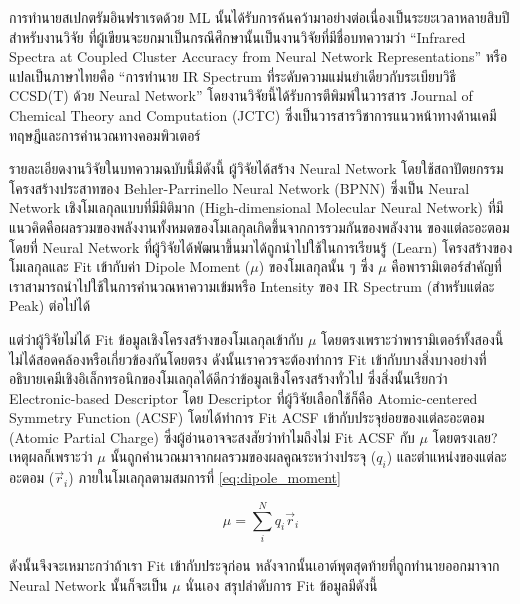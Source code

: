 การทำนายสเปกตรัมอินฟราเรดด้วย ML นั้นได้รับการค้นคว้ามาอย่างต่อเนื่องเป็นระยะเวลาหลายสิบปี\autocite{gastegger2017} สำหรับงานวิจัย%
ที่ผู้เขียนจะยกมาเป็นกรณีศึกษานั้นเป็นงานวิจัยที่มีชื่อบทความว่า \enquote{Infrared Spectra at Coupled Cluster Accuracy from Neural 
Network Representations} หรือแปลเป็นภาษาไทยคือ \enquote{การทำนาย IR Spectrum ที่ระดับความแม่นยำเดียวกับระเบียบวิธี CCSD(T) 
ด้วย Neural Network}\autocite{beckmann2022} โดยงานวิจัยนี้ได้รับการตีพิมพ์ในวารสาร Journal of Chemical Theory and Computation 
(JCTC) ซึ่งเป็นวารสารวิชาการแนวหน้าทางด้านเคมีทฤษฎีและการคำนวณทางคอมพิวเตอร์ 

รายละเอียดงานวิจัยในบทความฉบับนี้มีดังนี้ ผู้วิจัยได้สร้าง Neural Network โดยใช้สถาปัตยกรรมโครงสร้างประสาทของ Behler-Parrinello 
Neural Network (BPNN)\autocite{behler2007,behler2011b,behler2015} ซึ่งเป็น Neural Network เชิงโมเลกุลแบบที่มีมิติมาก 
(High-dimensional Molecular Neural Network) ที่มีแนวคิดคือผลรวมของพลังงานทั้งหมดของโมเลกุลเกิดขึ้นจากการรวมกันของพลังงาน%
ของแต่ละอะตอม โดยที่ Neural Network ที่ผู้วิจัยได้พัฒนาขึ้นมาได้ถูกนำไปใช้ในการเรียนรู้ (Learn) โครงสร้างของโมเลกุลและ Fit เข้ากับค่า 
Dipole Moment ($\mu$) ของโมเลกุลนั้น ๆ ซึ่ง $\mu$ คือพารามิเตอร์สำคัญที่เราสามารถนำไปใช้ในการคำนวณหาความเข้มหรือ Intensity 
ของ IR Spectrum (สำหรับแต่ละ Peak) ต่อไปได้

แต่ว่าผู้วิจัยไม่ได้ Fit ข้อมูลเชิงโครงสร้างของโมเลกุลเข้ากับ $\mu$ โดยตรงเพราะว่าพารามิเตอร์ทั้งสองนี้ไม่ได้สอดคล้องหรือเกี่ยวข้องกันโดยตรง 
ดังนั้นเราควรจะต้องทำการ Fit เข้ากับบางสิ่งบางอย่างที่อธิบายเคมีเชิงอิเล็กทรอนิกของโมเลกุลได้ดีกว่าข้อมูลเชิงโครงสร้างทั่วไป ซึ่งสิ่งนั้นเรียกว่า 
Electronic-based Descriptor โดย Descriptor ที่ผู้วิจัยเลือกใช้ก็คือ Atomic-centered Symmetry Function (ACSF) โดยได้ทำการ 
Fit ACSF เข้ากับประจุย่อยของแต่ละอะตอม (Atomic Partial Charge) ซึ่งผู้อ่านอาจจะสงสัยว่าทำไมถึงไม่ Fit ACSF กับ $\mu$ โดยตรงเลย? 
เหตุผลก็เพราะว่า $\mu$ นั้นถูกคำนวณมาจากผลรวมของผลคูณระหว่างประจุ ($q_{i}$) และตำแหน่งของแต่ละอะตอม ($\vec{r}_{i}$) 
ภายในโมเลกุลตามสมการที่ \ref{eq:dipole_moment}

\begin{equation}\label{eq:dipole_moment}
    \mu = \sum^{N}_{i} q_{i}\vec{r}_{i}
\end{equation}

\noindent ดังนั้นจึงจะเหมาะกว่าถ้าเรา Fit เข้ากับประจุก่อน หลังจากนั้นเอาต์พุตสุดท้ายที่ถูกทำนายออกมาจาก Neural Network นั้นก็จะเป็น 
$\mu$ นั่นเอง สรุปลำดับการ Fit ข้อมูลมีดังนี้ 


